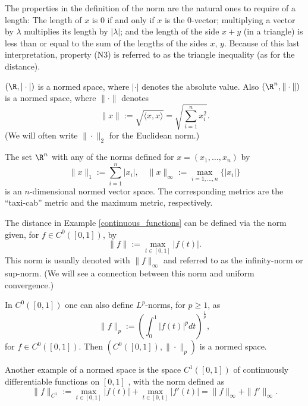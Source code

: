 \np

\begin{remark}
The properties in the definition of the norm are the natural ones to require of a length: The length of $x$ is $0$ if and only if $x$ is the $0$-vector; multiplying a vector by $\lambda$ multiplies its length by $|\lambda|$; and the length of the side $x + y$ (in a triangle) is less than or equal to the sum of the lengths of the sides $x$, $y$. Because of this last interpretation, property (N3) is referred to as the triangle inequality (as for the distance).
\end{remark}

\np

\begin{example}[Norms in $\R^n$]
$(\R,|\cdot|)$ is a normed space, where $|\cdot|$ denotes the absolute value. Also $(\R^n,\|\cdot\|)$ is a normed space, where $\|\cdot\|$ denotes
$$
\|x\|:= \sqrt{\langle x,x\rangle} = \sqrt{\sum_{i=1}^n x_i^2}.
$$
(We will often write $\|\cdot\|_2$ for the Euclidean norm.)

\medskip

The set $\R^n$ with any of the norms defined for $x = (x_1,\dots, x_n)$ by 
$$
\|x\|_1 := \sum_{i=1}^n|x_i|, \quad \|x\|_{\infty} := \max_{i=1,\dots,n}\{ |x_i|\}
$$
is an $n$-dimensional normed vector space. The corresponding metrics are the ``taxi-cab'' metric and the maximum metric, respectively.

\end{example}

\np

\begin{example}\label{continuous_functions-N}
The distance in Example \ref{continuous_functions} can be defined via the norm given, for $f \in C^0([0,1])$, by 
$$
\|f\|:= \max_{t \in [0,1]} |f(t)|.
$$
This norm is usually denoted with $\|f\|_{\infty}$ and referred to as the infinity-norm or sup-norm. (We will see a connection between this norm and uniform convergence.)

\noindent
In $C^0([0,1])$ one can also define $L^p$-norms, for $p\geq 1$, as
$$
\|f\|_p:= \left(\int_0^1|f(t)|^p dt\right)^{\frac1p},
$$
for $f\in C^0([0,1])$. Then $(C^0([0,1]), \|\cdot\|_p)$ is a normed space.


Another example of a normed space is the space $C^1([0,1])$ of continuously differentiable functions on $[0,1]$%
%
, with the norm defined as 
$$
\|f\|_{C^1}:= \max_{t \in [0,1]} |f(t)| + \max_{t \in [0,1]} |f'(t)| = \|f\|_{\infty}+\|f'\|_{\infty}.
$$

\end{example}


